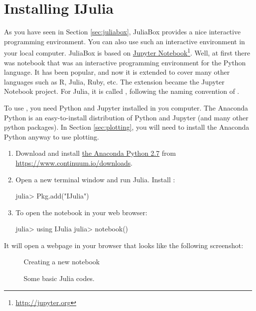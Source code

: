 \section{Installing IJulia} \label{sec:ijulia}

As you have seen in Section \ref{sec:juliabox}, JuliaBox provides a nice interactive programming environment. You can also use such an interactive environment in your local computer. JuliaBox is based on \href{http://jupyter.org}{Jupyter Notebook}\footnote{\url{http://jupyter.org}}. Well, at first there was  notebook that was an interactive programming environment for the Python language. It has been popular, and now it is extended to cover many other languages such as R, Julia, Ruby, etc. The extension became the Jupyter Notebook project. For Julia, it is called , following the naming convention of .

To use , you need Python and Jupyter installed in you computer. The Anaconda Python is an easy-to-install distribution of Python and Jupyter (and many other python packages). In Section \ref{sec:plotting}, you will need to install the Anaconda Python anyway to use plotting.

\begin{enumerate}
\item Download and install \href{https://www.continuum.io/downloads}{the Anaconda Python 2.7} from \url{https://www.continuum.io/downloads}.
\item Open a new terminal window and run Julia. Install :
\begin{code}
julia> Pkg.add("IJulia")
\end{code}
\item To open the  notebook in your web browser:
\begin{code}
julia> using IJulia
julia> notebook()
\end{code}
\end{enumerate}

It will open a webpage in your browser that looks like the following screenshot:

\begin{figure}
\caption{Creating a new notebook\label{fig:ijulia_new}}
\end{figure}

\begin{figure}
\caption{Some basic Julia codes.\label{fig:ijulia_basic}}
\end{figure}


